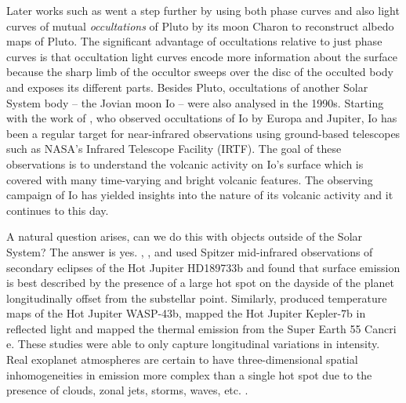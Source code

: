 \documentclass[12pt,dvipsnames]{report}
\begin{document}
Later works such as
\citet{1986AJ.....92.1201D,1992Icar...97..211B,1993Icar..102..134Y,1999AJ....117.1063Y}
went a step further by using both phase curves and also light curves of
mutual \emph{occultations} of Pluto by its moon Charon to reconstruct albedo
maps of Pluto. The significant advantage of occultations relative to just
phase curves is that occultation light curves encode more information 
about the surface because the sharp limb of the occultor sweeps over the disc of
the occulted body and exposes its different parts. 
Besides Pluto, occultations of another Solar System body -- the Jovian moon Io -- 
were also analysed in the 1990s. 
Starting with the work of \citet{1994Icar..107..195S}, who observed occultations 
of Io by Europa and Jupiter, Io has been a regular target for near-infrared observations 
using ground-based telescopes such as NASA's 
Infrared Telescope Facility (IRTF). The goal of these observations is to understand 
the volcanic activity on Io's surface which is covered with many time-varying
and bright volcanic features. The observing campaign of Io has yielded insights
into the nature of its volcanic activity and it continues to this day. 

A natural question arises, can we do this with objects outside of the Solar
System? The answer is yes. \citet{2007Natur.447..183K},
\citet{2012ApJ...747L..20M}, and \citet{arXiv:1202.3829} used Spitzer
mid-infrared observations of secondary eclipses of the Hot Jupiter HD189733b
and found that surface emission is best described by the presence of a large
hot spot on the dayside of the planet longitudinally offset from the
substellar point. Similarly, \citet{2014Sci...346..838S} produced temperature
maps of the Hot Jupiter WASP-43b, \citet{2013ApJ...776L..25D} mapped the Hot
Jupiter Kepler-7b in reflected light and \citet{2016Natur.532..207D} mapped the
thermal emission from the Super Earth 55 Cancri e. These studies were able
to only capture longitudinal variations in intensity. Real exoplanet atmospheres 
are certain to have three-dimensional spatial inhomogeneities in emission more
complex than a single hot spot due to the presence of clouds, zonal jets,
storms, waves, etc. \citep{2020SSRv..216..139S}. 
\end{document}
